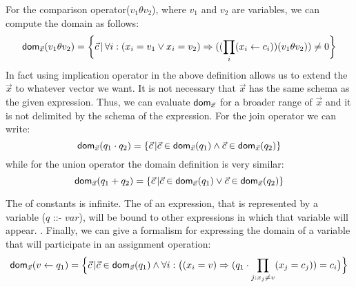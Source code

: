 \documentclass[12pt]{article}
\begin{document}
For the comparison operator($v_{1}\theta v_{2}$), where $v_1$ and $v_2$ are variables, we can compute the domain as follows:
\begin{equation*}
\text{\textsf{dom}{}}_{\vec{x}}(v_{1}\theta v_{2})=\bigg\{\vec{c}\,|\,\forall i:(x_{i}=v_{1}\lor x_{i}=v_{2})\Rightarrow ((\prod_{i}(x_{i}\gets c_{i}))(v_{1}\theta v_{2}))\not= 0\bigg\}
\end{equation*}
In fact using implication operator in the above definition allows us to extend the $\vec{x}$ to whatever vector we want. It is not necessary that $\vec{x}$  has the same schema as the given expression. Thus, we can evaluate $\text{\textsf{dom}}_{\vec{x}}$ for a broader range of $\vec{x}$ and it is not delimited by the schema of the expression. 
For the join operator we can write:
\begin{equation*}
\text{\textsf{dom}{}}_{\vec{x}}(q_{1}\cdot q_{2})=\{\vec{c}\,|\vec{c}\in\text{\textsf{dom}{}}_{\vec{x}}(q_{1})\land\vec{c}\in\text{\textsf{dom}{}}_{\vec{x}}(q_{2})\}
\end{equation*}
while for the union operator the domain definition is very similar:
\begin{equation*}
\text{\textsf{dom}{}}_{\vec{x}}(q_{1}+ q_{2})=\{\vec{c}\,|\vec{c}\in\text{\textsf{dom}{}}_{\vec{x}}(q_{1})\lor\vec{c}\in\text{\textsf{dom}{}}_{\vec{x}}(q_{2})\}
\end{equation*}
\par
The \dom{} of constants is infinite. The \dom{} of an expression, that is represented by a variable ($q$ ::- $var$), will be bound to other expressions in which that variable will appear.
. Finally, we can give a formalism for expressing the domain of a variable that will participate in an assignment operation:
\begin{equation*}
\text{\textsf{dom}{}}_{\vec{x}}(v\gets q_{1})=\Big\{\vec{c}\,|\vec{c}\in\text{\textsf{dom}{}}_{\vec{x}}(q_{1})\land \forall i:\big((x_{i}=v)\Rightarrow(q_{1}\cdot\prod_{j: x_{j}\neq v} (x_{j}=c_{j}))=c_{i}\big)\Big\}
\end{equation*}
\end{document}
